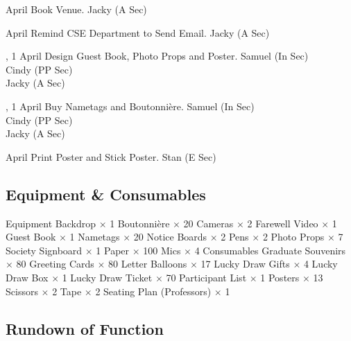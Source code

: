 \bTR{}
\eTD{} April
\eTD\bTD Book Venue.
\eTD\bTD Jacky (A Sec)
\eTD\eTR

\bTR{}
\eTD{} April
\eTD\bTD Remind CSE Department to Send Email.
\eTD\bTD Jacky (A Sec)
\eTD\eTR

\bTR{}, 1
\eTD{} April
\eTD\bTD Design Guest Book, Photo Props and Poster.
\eTD\bTD Samuel (In Sec) \\ Cindy (PP Sec) \\ Jacky (A Sec)
\eTD\eTR

\bTR{}, 1
\eTD{} April
\eTD\bTD Buy Nametags and Boutonnière.
\eTD\bTD Samuel (In Sec) \\ Cindy (PP Sec) \\ Jacky (A Sec)
\eTD\eTR

\bTR{}
\eTD{} April
\eTD\bTD Print Poster and Stick Poster.
\eTD\bTD Stan (E Sec)
\eTD\eTR

\eTABLEbody
\eTABLE

\subsection{Equipment \& Consumables}
\starttabulate[|l|l|]
\NC{}Equipment\NC\NR
\HL
\NC Backdrop            \NC $\times$ 1  \NR
\NC Boutonnière         \NC $\times$ 20 \NR
\NC Cameras             \NC $\times$ 2  \NR
\NC Farewell Video      \NC $\times$ 1  \NR
\NC Guest Book          \NC $\times$ 1  \NR
\NC Nametags            \NC $\times$ 20 \NR
\NC Notice Boards       \NC $\times$ 2  \NR
\NC Pens                \NC $\times$ 2  \NR
\NC Photo Props         \NC $\times$ 7  \NR
\NC Society Signboard   \NC $\times$ 1  \NR
\NC Paper               \NC $\times$ 100\NR
\NC Mics                \NC $\times$ 4  \NR
\HL
\NR
\NC{}Consumables\NC\NR
\HL
\NC Graduate Souvenirs  \NC $\times$ 80 \NR
\NC Greeting Cards      \NC $\times$ 80 \NR
\NC Letter Balloons     \NC $\times$ 17 \NR
\NC Lucky Draw Gifts    \NC $\times$ 4  \NR
\NC Lucky Draw Box      \NC $\times$ 1  \NR
\NC Lucky Draw Ticket   \NC $\times$ 70 \NR
\NC Participant List    \NC $\times$ 1  \NR
\NC Posters             \NC $\times$ 13 \NR
\NC Scissors            \NC $\times$ 2  \NR
\NC Tape                \NC $\times$ 2  \NR
\NC Seating Plan (Professors) \NC $\times$ 1  \NR
\HL
\stoptabulate

\pagebreak
\subsection{Rundown of Function}

